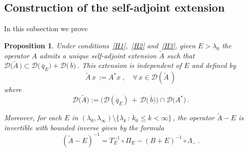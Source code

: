 \documentclass[12pt,reqno]{amsart}
\newtheorem{proposition}[theorem]{Proposition}
\newcommand{\be}[1]{\begin{equation}\label{#1}}
\newcommand{\ee}{\end{equation}}
\renewcommand{\(}{\left(}
\renewcommand{\)}{\right)}
\begin{document}
\subsection{Construction of the self-adjoint extension}\label{Section:sa-extension1}

In this subsection we prove
\begin{proposition}\label{Prop:thm1-b} Under conditions~\eqref{H1},~\eqref{H2} and~\eqref{H3}, given $E>\lambda_0$ the operator $A$ admits a unique self-adjoint extension $\widetilde A$ such that $\mathcal D\big(\widetilde A\,\big)\subset \mathcal D\big(\,\overline{q}_E\big)+\mathcal D\big(\,\overline{b}\big)\,$. This extension is independent of $E$ and defined by
\be{def tilde A}
\widetilde A\,x\,:= A^*x\;,\quad \forall\,x\in \mathcal D\(\widetilde A\,\)
\ee
where
\be{domainE}
\mathcal D\big(\widetilde A\big):=\big(\mathcal D(\overline{q}_E)\,+\,\mathcal D\big(\,\overline{b}\big)\big)\cap\mathcal D\big(A^*\big)\,.
\ee

Moreover, for each $E$ in  $(\lambda_0,\lambda_\infty)\setminus\{\lambda_k\,:\,k_0\leq k<\infty\}\,$, the operator $\widetilde A-E$ is invertible with bounded inverse given by the formula
\be{inverse}
\left(\widetilde A-E\right)^{-1}=T_E^{-1}\circ \Pi_E -(B+E)^{-1}\circ \Lambda_-\,.
\ee
\end{proposition}
\end{document}
